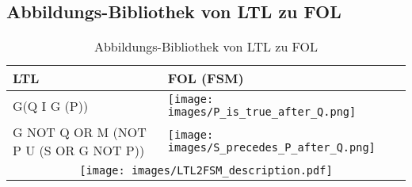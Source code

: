 \subsection{Abbildungs-Bibliothek von LTL zu FOL}
\label{subsec:app_ltl2fol_lib}
\begin{table}[H]
	\centering
	\begin{tabularx}{\textwidth}{|p{}|p{}|}
		\hline
		LTL & FOL (FSM) \\ \hline
		G(Q I G (P)) & \texttt{[image: images/P\_is\_true\_after\_Q.png]} \\ \hline
		G NOT Q OR M (NOT P U \newline(S OR G NOT P)) & \texttt{[image: images/S\_precedes\_P\_after\_Q.png]} \\ \hline
		\multicolumn{2}{|c|}{\hspace{0.5cm}\texttt{[image: images/LTL2FSM\_description.pdf]}} \\ \hline
	\end{tabularx}
	\caption{Abbildungs-Bibliothek von LTL zu FOL}
	\label{tab:ltl2fol_lib}
\end{table}